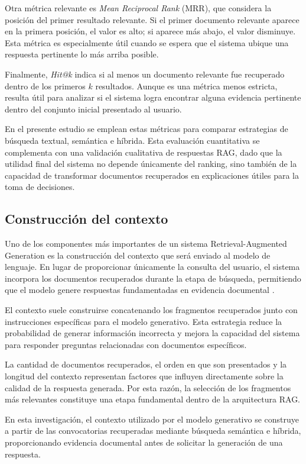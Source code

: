 Otra métrica relevante es \textit{Mean Reciprocal Rank} (MRR), que considera la posición del primer resultado relevante. Si el primer documento relevante aparece en la primera posición, el valor es alto; si aparece más abajo, el valor disminuye. Esta métrica es especialmente útil cuando se espera que el sistema ubique una respuesta pertinente lo más arriba posible.

Finalmente, \textit{Hit@k} indica si al menos un documento relevante fue recuperado dentro de los primeros \(k\) resultados. Aunque es una métrica menos estricta, resulta útil para analizar si el sistema logra encontrar alguna evidencia pertinente dentro del conjunto inicial presentado al usuario.

En el presente estudio se emplean estas métricas para comparar estrategias de búsqueda textual, semántica e híbrida. Esta evaluación cuantitativa se complementa con una validación cualitativa de respuestas RAG, dado que la utilidad final del sistema no depende únicamente del ranking, sino también de la capacidad de transformar documentos recuperados en explicaciones útiles para la toma de decisiones.

\subsection{Construcción del contexto}

Uno de los componentes más importantes de un sistema Retrieval-Augmented Generation es la construcción del contexto que será enviado al modelo de lenguaje. En lugar de proporcionar únicamente la consulta del usuario, el sistema incorpora los documentos recuperados durante la etapa de búsqueda, permitiendo que el modelo genere respuestas fundamentadas en evidencia documental \parencite{lewis2020retrieval}.

El contexto suele construirse concatenando los fragmentos recuperados junto con instrucciones específicas para el modelo generativo. Esta estrategia reduce la probabilidad de generar información incorrecta y mejora la capacidad del sistema para responder preguntas relacionadas con documentos específicos.

La cantidad de documentos recuperados, el orden en que son presentados y la longitud del contexto representan factores que influyen directamente sobre la calidad de la respuesta generada. Por esta razón, la selección de los fragmentos más relevantes constituye una etapa fundamental dentro de la arquitectura RAG.

En esta investigación, el contexto utilizado por el modelo generativo se construye a partir de las convocatorias recuperadas mediante búsqueda semántica e híbrida, proporcionando evidencia documental antes de solicitar la generación de una respuesta.

